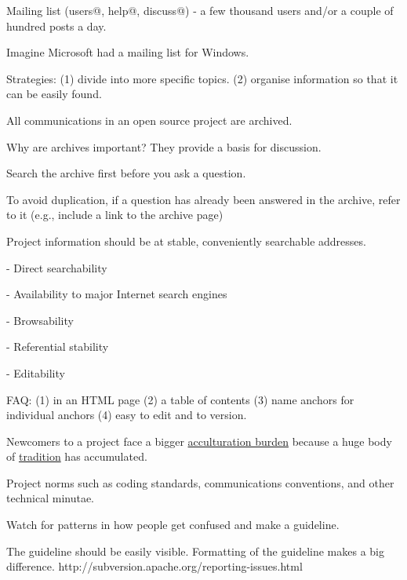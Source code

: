 \documentclass[landscape,30pt]{foils}
\begin{document}

Mailing list (users@, help@, discuss@) - a few thousand users and/or a couple of hundred posts a day.

Imagine Microsoft had a mailing list for Windows.

Strategies: (1) divide into more specific topics. (2) organise information so that it can be easily found.



All communications in an open source project are archived.

Why are archives important?  They provide a basis for discussion.

Search the archive first before you ask a question.

To avoid duplication, if a question has already been answered in the archive, refer to it (e.g., include a link to the archive page)



Project information should be at stable, conveniently searchable addresses.

- Direct searchability

- Availability to major Internet search engines

- Browsability

- Referential stability

- Editability 

FAQ: (1) in an HTML page (2) a table of contents (3) name anchors for individual anchors (4) easy to edit and to version.


Newcomers to a project face a bigger \underline{acculturation burden} because a huge body
of \underline{tradition} has accumulated.

Project norms such as coding standards, communications conventions, and other technical minutae.

Watch for patterns in how people get confused and make a guideline.

The guideline should be easily visible.  Formatting of the guideline makes a big difference.  http://subversion.apache.org/reporting-issues.html
\end{document}
